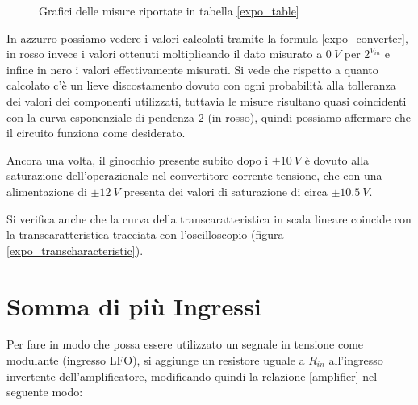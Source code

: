 \begin{figure}[H]
\begin{subfigure}{.5\textwidth}
    \end{subfigure}

    \caption{Grafici delle misure riportate in tabella \ref{expo_table}}
    \label{expo_graphs}
\end{figure}

In azzurro possiamo vedere i valori calcolati tramite la formula \ref{expo_converter},
in rosso invece i valori ottenuti moltiplicando il dato misurato a $0\ V$ per $2^{V_{in}}$
e infine in nero i valori effettivamente misurati. Si vede che rispetto a quanto calcolato
c'è un lieve discostamento dovuto con ogni probabilità alla tolleranza dei valori dei
componenti utilizzati, tuttavia le misure risultano quasi coincidenti con la curva esponenziale
di pendenza $2$ (in rosso), quindi possiamo affermare che il circuito funziona come desiderato.

Ancora una volta, il ginocchio presente subito dopo i $+10\ V$ è dovuto alla saturazione
dell'operazionale nel convertitore corrente-tensione, che con una alimentazione di $\pm12\ V$
presenta dei valori di saturazione di circa $\pm10.5\ V$.

Si verifica anche che la curva della transcaratteristica in scala lineare coincide con la
transcaratteristica tracciata con l'oscilloscopio (figura \ref{expo_transcharacteristic}).


\section{Somma di più Ingressi}


Per fare in modo che possa essere utilizzato un segnale in tensione come modulante (ingresso
LFO), si aggiunge un resistore uguale a $R_{in}$ all'ingresso invertente dell'amplificatore,
modificando quindi la relazione \ref{amplifier} nel seguente modo:

